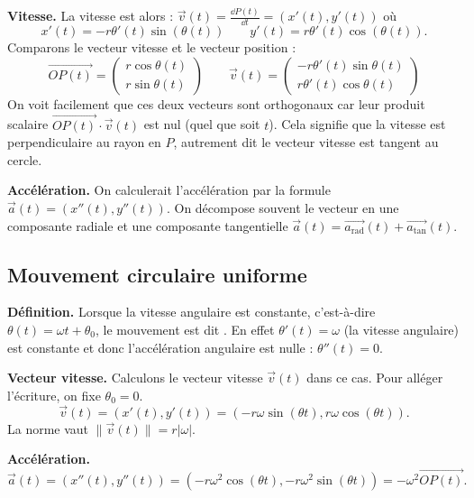 \documentclass[11pt,class=report,crop=false]{standalone}
\begin{document}

\textbf{Vitesse.}
La vitesse est alors :
$\vec{v}(t) = \frac{\dd P(t)}{\dd t} = (x'(t), y'(t))$
où 
$$x'(t) = -r \theta'(t) \sin(\theta(t)) \qquad y'(t) = r \theta'(t) \cos(\theta(t)).$$
Comparons le vecteur vitesse et le vecteur position :
$$\vec{OP(t)} = \begin{pmatrix} r \cos\theta(t)  \\ r \sin\theta(t) \end{pmatrix}
\qquad 
\vec{v}(t) = \begin{pmatrix} -r \theta'(t) \sin\theta(t) \\  r \theta'(t) \cos\theta(t)\end{pmatrix}$$
On voit facilement que ces deux vecteurs sont orthogonaux car leur produit scalaire
$ \vec{OP(t)} \cdot \vec{v}(t)$ est nul (quel que soit $t$). Cela signifie que la vitesse est perpendiculaire au rayon en $P$, autrement dit le vecteur vitesse est tangent au cercle.

\textbf{Accélération.}
On calculerait l'accélération par la formule $\vec{a}(t) = (x''(t), y''(t))$.
On décompose souvent le vecteur en une composante radiale et une composante tangentielle $\vec{a}(t) = \vec{a_{\text{rad}}}(t) + \vec{a_{\text{tan}}}(t)$.



\subsection{Mouvement circulaire uniforme}

\textbf{Définition.}
Lorsque la vitesse angulaire est constante, c'est-à-dire $\theta(t) = \omega t + \theta_0$, le mouvement est dit .
En effet $\theta'(t) = \omega$ (la vitesse angulaire) est constante et
donc l'accélération angulaire est nulle : $\theta''(t) = 0$.


\textbf{Vecteur vitesse.}
Calculons le vecteur vitesse $\vec{v}(t)$ dans ce cas. Pour alléger l'écriture, on fixe $\theta_0=0$.
$$\vec{v}(t) 
= (x'(t), y'(t))
= \left( -r \omega \sin(\theta t) ,  r \omega \cos(\theta t) \right).$$
La norme vaut $\| \vec{v}(t) \| = r |\omega|$.

\textbf{Accélération.}
$$\vec{a}(t) 
= (x''(t), y''(t))
= \left( -r \omega^2 \cos(\theta t) ,  -r \omega^2 \sin(\theta t) \right)
= -\omega^2 \vec{OP(t)}.$$
\end{document}
